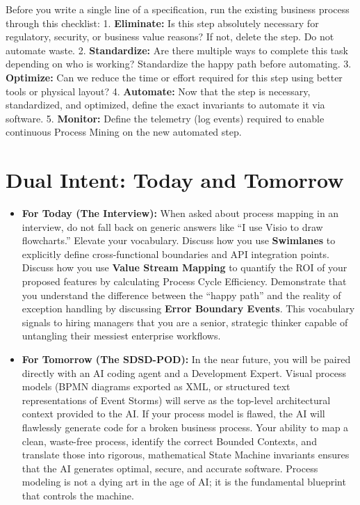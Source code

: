 Before you write a single line of a specification, run the existing
business process through this checklist: 1. \textbf{Eliminate:} Is this
step absolutely necessary for regulatory, security, or business value
reasons? If not, delete the step. Do not automate waste. 2.
\textbf{Standardize:} Are there multiple ways to complete this task
depending on who is working? Standardize the happy path before
automating. 3. \textbf{Optimize:} Can we reduce the time or effort
required for this step using better tools or physical layout? 4.
\textbf{Automate:} Now that the step is necessary, standardized, and
optimized, define the exact invariants to automate it via software. 5.
\textbf{Monitor:} Define the telemetry (log events) required to enable
continuous Process Mining on the new automated step.

\bigskip

\section{Dual Intent: Today and
Tomorrow}\label{dual-intent-today-and-tomorrow}

\begin{itemize}
\item
  \textbf{For Today (The Interview):} When asked about process mapping
  in an interview, do not fall back on generic answers like ``I use
  Visio to draw flowcharts.'' Elevate your vocabulary. Discuss how you
  use \textbf{Swimlanes} to explicitly define cross-functional
  boundaries and API integration points. Discuss how you use
  \textbf{Value Stream Mapping} to quantify the ROI of your proposed
  features by calculating Process Cycle Efficiency. Demonstrate that you
  understand the difference between the ``happy path'' and the reality
  of exception handling by discussing \textbf{Error Boundary Events}.
  This vocabulary signals to hiring managers that you are a senior,
  strategic thinker capable of untangling their messiest enterprise
  workflows.
\item
  \textbf{For Tomorrow (The SDSD-POD):} In the near future, you will be
  paired directly with an AI coding agent and a Development Expert.
  Visual process models (BPMN diagrams exported as XML, or structured
  text representations of Event Storms) will serve as the top-level
  architectural context provided to the AI. If your process model is
  flawed, the AI will flawlessly generate code for a broken business
  process. Your ability to map a clean, waste-free process, identify the
  correct Bounded Contexts, and translate those into rigorous,
  mathematical State Machine invariants ensures that the AI generates
  optimal, secure, and accurate software. Process modeling is not a
  dying art in the age of AI; it is the fundamental blueprint that
  controls the machine.
\end{itemize}


